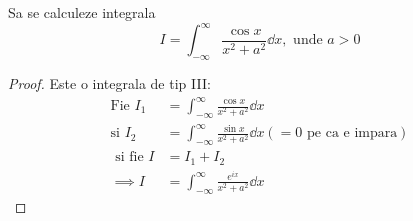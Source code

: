 \begin{aplicatie}
    Sa se calculeze integrala
    \[
        I = \int_{-\infty}^{\infty} \frac{\cos x}{x^2+a^2} \dd x, \text{ unde } a>0
    \]
    \begin{proof}
        Este o integrala de tip III:
        \begin{align*}
            \text{Fie } I_1 &= \int_{-\infty}^{\infty} \frac{\cos x}{x^2+a^2} \dd x \\
            \text{si }  I_2 &= \int_{-\infty}^{\infty} \frac{\sin x}{x^2+a^2} \dd x (= 0 \text{ pe ca e impara}) \\
            \text{ si fie } I &= I_1+I_2 \\
            \implies I &= \int_{-\infty}^{\infty} \frac{e^{ix}}{x^2+a^2} \dd x
        \end{align*}

    \end{proof}
\end{aplicatie}